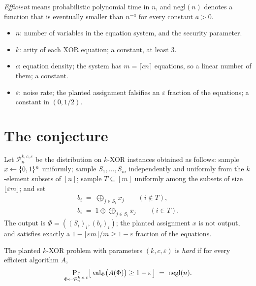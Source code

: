 \documentclass{aicr-conjecture}
\newcommand{\bits}{\{0,1\}}
\newcommand{\val}{\mathrm{val}}
\newcommand{\negl}{\mathrm{negl}}
\newcommand{\Pdist}{\mathcal{P}^{k,c,\varepsilon}_n}
\begin{document}
\emph{Efficient} means probabilistic polynomial time in $n$, and
$\negl(n)$ denotes a function that is eventually smaller than $n^{-a}$
for every constant $a > 0$.

\begin{itemize}[leftmargin=1.2em]
\item $n$: number of variables in the equation system, and the security
  parameter.
\item $k$: arity of each XOR equation; a constant, at least $3$.
\item $c$: equation density; the system has $m = \lceil cn \rceil$
  equations, so a linear number of them; a constant.
\item $\varepsilon$: noise rate; the planted assignment falsifies an
  $\varepsilon$ fraction of the equations; a constant in $(0,1/2)$.
\end{itemize}

\section{The conjecture}\label{sec:conjectures}

\begin{definition}\label{def:kxor}
Let $\Pdist$ be the distribution on $k$-XOR instances obtained as
follows: sample $x \sample \bits^n$ uniformly; sample $S_1,\dots,S_m$
independently and uniformly from the $k$-element subsets of $[n]$;
sample $T \subseteq [m]$ uniformly among the subsets of size
$\lfloor \varepsilon m \rfloor$; and set
\begin{gather*}
  b_i \;=\; \bigoplus_{j \in S_i} x_j \qquad (i \notin T), \\
  b_i \;=\; 1 \oplus \bigoplus_{j \in S_i} x_j \qquad (i \in T).
\end{gather*}
The output is $\Phi = ((S_i)_{i}, (b_i)_{i})$; the planted assignment
$x$ is not output, and satisfies exactly a
$1 - \lfloor \varepsilon m\rfloor / m \ge 1-\varepsilon$ fraction of
the equations.

The planted $k$-XOR problem with parameters $(k,c,\varepsilon)$ is
\emph{hard} if for every efficient algorithm $A$,
\[
  \Pr_{\Phi \sample \Pdist}
  \bigl[\, \val_\Phi\bigl(A(\Phi)\bigr) \ge 1 - \varepsilon \,\bigr]
  \;=\; \negl(n).
\]
\end{definition}
\end{document}

